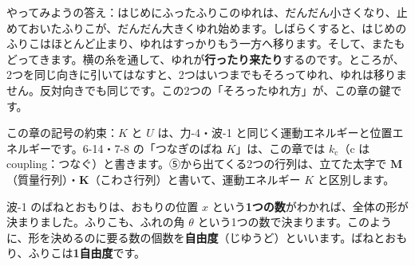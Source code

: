 \noindent やってみようの答え：はじめにふったふりこのゆれは、だんだん小さくなり、止めておいたふりこが、だんだん大きくゆれ始めます。しばらくすると、はじめのふりこはほとんど止まり、ゆれはすっかりもう一方へ移ります。そして、またもどってきます。横の糸を通して、ゆれが\textbf{行ったり来たり}するのです。ところが、2つを同じ向きに引いてはなすと、2つはいつまでもそろってゆれ、ゆれは移りません。反対向きでも同じです。この2つの「そろったゆれ方」が、この章の鍵です。

\begin{omoidasou}
\end{omoidasou}

\noindent この章の記号の約束：$K$ と $U$ は、力-4・波-1 と同じく運動エネルギーと位置エネルギーです。6-14・7-8 の「つなぎのばね $K$」は、この章では $k_{\mathrm c}$（c は coupling：つなぐ）と書きます。⑤から出てくる2つの行列は、立てた太字で $\mathbf M$（質量行列）・$\mathbf K$（こわさ行列）と書いて、運動エネルギー $K$ と区別します。



\label{ph:波-3:sec1}
波-1 のばねとおもりは、おもりの位置 $x$ という\textbf{1つの数}がわかれば、全体の形が決まりました。ふりこも、ふれの角 $\theta$ という1つの数で決まります。このように、形を決めるのに要る数の個数を\textbf{自由度}（じゆうど）といいます。ばねとおもり、ふりこは\textbf{1自由度}です。

